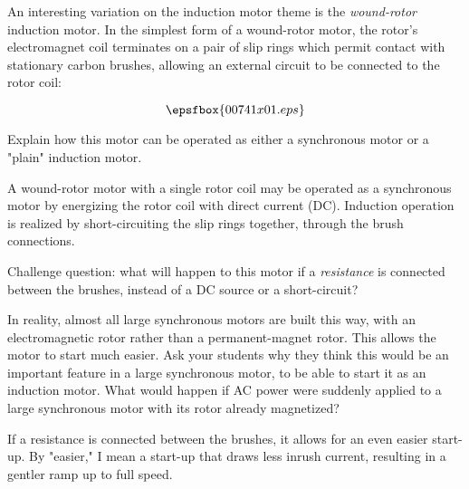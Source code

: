 

An interesting variation on the induction motor theme is the {\it wound-rotor} induction motor.  In the simplest form of a wound-rotor motor, the rotor's electromagnet coil terminates on a pair of slip rings which permit contact with stationary carbon brushes, allowing an external circuit to be connected to the rotor coil:

$$\epsfbox{00741x01.eps}$$

Explain how this motor can be operated as either a synchronous motor or a "plain" induction motor.







A wound-rotor motor with a single rotor coil may be operated as a synchronous motor by energizing the rotor coil with direct current (DC).  Induction operation is realized by short-circuiting the slip rings together, through the brush connections.

\vskip 10pt

Challenge question: what will happen to this motor if a {\it resistance} is connected between the brushes, instead of a DC source or a short-circuit?







In reality, almost all large synchronous motors are built this way, with an electromagnetic rotor rather than a permanent-magnet rotor.  This allows the motor to start much easier.  Ask your students why they think this would be an important feature in a large synchronous motor, to be able to start it as an induction motor.  What would happen if AC power were suddenly applied to a large synchronous motor with its rotor already magnetized?

If a resistance is connected between the brushes, it allows for an even easier start-up.  By "easier," I mean a start-up that draws less inrush current, resulting in a gentler ramp up to full speed.




